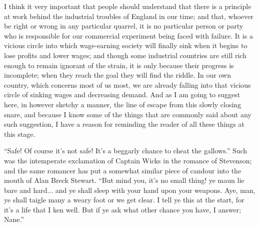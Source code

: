 \documentclass{book}
\begin{document}
I think it very important that people should understand that there is a principle at work behind the industrial troubles of England in our time; and that, whoever be right or wrong in any particular quarrel, it is no particular person or party who is responsible for our commercial experiment being faced with failure. It is a vicious circle into which wage-earning society will finally sink when it begins to lose profits and lower wages; and though some industrial countries are still rich enough to remain ignorant of the strain, it is only because their progress is incomplete; when they reach the goal they will find the riddle. In our own country, which concerns most of us most, we are already falling into that vicious circle of sinking wages and decreasing demand. And as I am going to suggest here, in however sketchy a manner, the line of escape from this slowly closing snare, and because I know some of the things that are commonly said about any such suggestion, I have a reason for reminding the reader of all these things at this stage.

“Safe! Of course it’s not safe! It’s a beggarly chance to cheat the gallows.” Such was the intemperate exclamation of Captain Wicks in the romance of Stevenson; and the same romancer has put a somewhat similar piece of candour into the mouth of Alan Breck Stewart. “But mind you, it’s no small thing! ye maun lie bare and hard... and ye shall sleep with your hand upon your weapons. Aye, man, ye shall taigle many a weary foot or we get clear. I tell ye this at the start, for it’s a life that I ken well. But if ye ask what other chance you have, I answer; Nane.”
\end{document}
